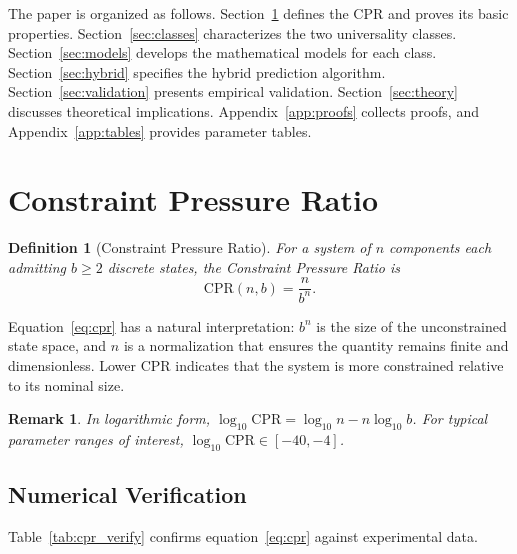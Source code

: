 \documentclass[12pt,a4paper]{article}
\newtheorem{definition}{Definition}
\newtheorem{remark}{Remark}
\begin{document}
The paper is organized as follows. Section~\ref{sec:cpr} defines the CPR and proves its basic properties. Section~\ref{sec:classes} characterizes the two universality classes. Section~\ref{sec:models} develops the mathematical models for each class. Section~\ref{sec:hybrid} specifies the hybrid prediction algorithm. Section~\ref{sec:validation} presents empirical validation. Section~\ref{sec:theory} discusses theoretical implications. Appendix~\ref{app:proofs} collects proofs, and Appendix~\ref{app:tables} provides parameter tables.

\section{Constraint Pressure Ratio}\label{sec:cpr}

\begin{definition}[Constraint Pressure Ratio]
For a system of $n$ components each admitting $b \geq 2$ discrete states, the \emph{Constraint Pressure Ratio} is
\begin{equation}\label{eq:cpr}
    \mathrm{CPR}(n,b) = \frac{n}{b^{n}}.
\end{equation}
\end{definition}

Equation~\eqref{eq:cpr} has a natural interpretation: $b^{n}$ is the size of the unconstrained state space, and $n$ is a normalization that ensures the quantity remains finite and dimensionless. Lower CPR indicates that the system is more constrained relative to its nominal size.

\begin{remark}
In logarithmic form, $\log_{10}\mathrm{CPR} = \log_{10} n - n\log_{10} b$. For typical parameter ranges of interest, $\log_{10}\mathrm{CPR} \in [-40, -4]$.
\end{remark}

\subsection{Numerical Verification}

Table~\ref{tab:cpr_verify} confirms equation~\eqref{eq:cpr} against experimental data.
\end{document}
